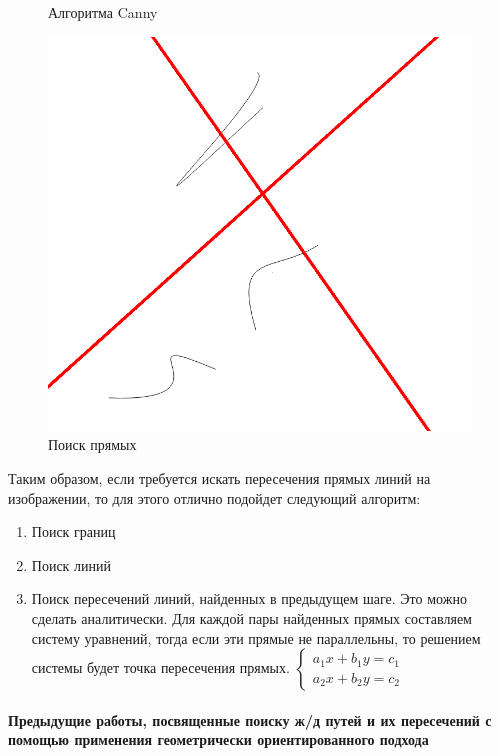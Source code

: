 \begin{enumerate}
\begin{figure}[!h]
\begin{minipage}{0.45\textwidth}
			\caption[Y]{Алгоритма Canny}
			\label{fig:canny_ex}
		\end{minipage}
		\begin{minipage}{0.45\textwidth}
			\centering
			\includegraphics[width=0.7\linewidth]{pictures/hough_ex}
			\caption[X]{Поиск прямых}
			\label{fig:hough_ex}
		\end{minipage}
	\end{figure}
\end{enumerate}

Таким образом, если требуется искать пересечения прямых линий на изображении, то для этого отлично подойдет следующий алгоритм:
\begin{enumerate}
	\item Поиск границ \cite{b:canny}
	\item Поиск линий \cite{b:hough_transform}
	\item Поиск пересечений линий, найденных в предыдущем шаге. Это можно сделать аналитически. Для каждой пары найденных прямых составляем систему уравнений, тогда если эти прямые не параллельны, то решением системы будет точка пересечения прямых.
	$
	\begin{cases}
	a_1x + b_1y = c_1 
	\\
	a_2x + b_2y = c_2 
	\end{cases}
	$
\end{enumerate}

\paragraph{Предыдущие работы, посвященные поиску ж/д путей и их пересечений с помощью применения геометрически ориентированного подхода}

